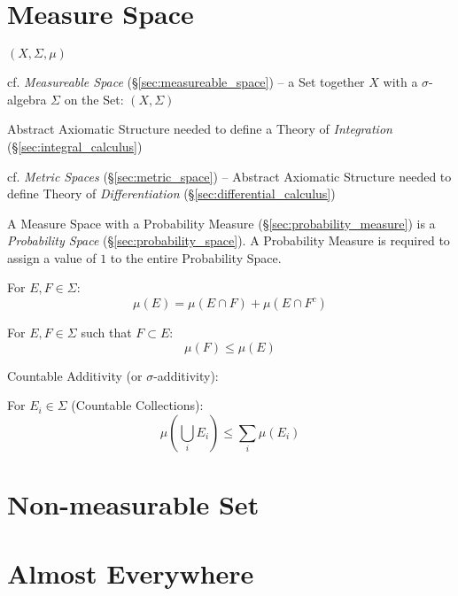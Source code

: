 \section{Measure Space}\label{sec:measure_space}

$(X,\Sigma,\mu)$

\fist cf. \emph{Measureable Space} (\S\ref{sec:measureable_space}) -- a Set
together $X$ with a $\sigma$-algebra $\Sigma$ on the Set: $(X,\Sigma)$

Abstract Axiomatic Structure needed to define a Theory of \emph{Integration}
(\S\ref{sec:integral_calculus})

cf. \emph{Metric Spaces} (\S\ref{sec:metric_space}) -- Abstract Axiomatic
Structure needed to define Theory of \emph{Differentiation}
(\S\ref{sec:differential_calculus})

A Measure Space with a Probability Measure (\S\ref{sec:probability_measure}) is
a \emph{Probability Space} (\S\ref{sec:probability_space}). A Probability
Measure is required to assign a value of $1$ to the entire Probability Space.

For $E,F \in \Sigma$:
\[
  \mu(E) = \mu(E \cap F) + \mu(E \cap F^c)
\]

For $E,F \in \Sigma$ such that $F \subset E$:
\[
  \mu(F) \leq \mu(E)
\]

Countable Additivity (or $\sigma$-additivity): %

For $E_i \in \Sigma$ (Countable Collections):
\[
  \mu(\bigcup_i E_i) \leq \sum_i \mu(E_i)
\]



\section{Non-measurable Set}\label{sec:nonmeasurable_set}

\section{Almost Everywhere}\label{sec:almost_everywhere}

